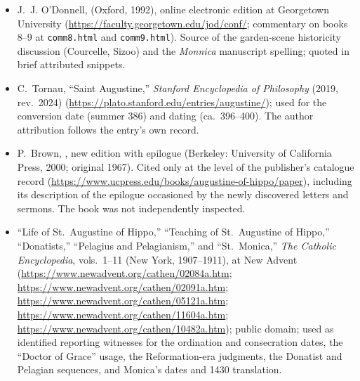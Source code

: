 \begin{itemize}
\item J.~J. O'Donnell, 
(Oxford, 1992), online electronic edition at Georgetown University
(\url{https://faculty.georgetown.edu/jod/conf/}; commentary on books 8--9
at \texttt{comm8.html} and \texttt{comm9.html}). Source of the garden-scene
historicity discussion (Courcelle, Sizoo) and the \textit{Monnica}
manuscript spelling; quoted in brief attributed snippets.
\item C.~Tornau, ``Saint Augustine,'' \textit{Stanford Encyclopedia of
Philosophy} (2019, rev.\ 2024)
(\url{https://plato.stanford.edu/entries/augustine/}); used for the
conversion date (summer 386) and  dating (ca.\ 396--400).
The author attribution follows the entry's own record.
\item P.~Brown, , new edition with
epilogue (Berkeley: University of California Press, 2000; original 1967).
Cited only at the level of the publisher's catalogue record
(\url{https://www.ucpress.edu/books/augustine-of-hippo/paper}), including
its description of the epilogue occasioned by the newly discovered letters
and sermons. The book was not independently inspected.
\item ``Life of St.~Augustine of Hippo,'' ``Teaching of St.~Augustine of
Hippo,'' ``Donatists,'' ``Pelagius and Pelagianism,'' and ``St.~Monica,''
\textit{The Catholic Encyclopedia}, vols.~1--11 (New York, 1907--1911), at
New Advent (\url{https://www.newadvent.org/cathen/02084a.htm};
\url{https://www.newadvent.org/cathen/02091a.htm};
\url{https://www.newadvent.org/cathen/05121a.htm};
\url{https://www.newadvent.org/cathen/11604a.htm};
\url{https://www.newadvent.org/cathen/10482a.htm}); public domain; used as
identified reporting witnesses for the ordination and consecration dates,
the ``Doctor of Grace'' usage, the Reformation-era judgments, the Donatist
and Pelagian sequences, and Monica's dates and 1430 translation.
\end{itemize}

\endgroup
